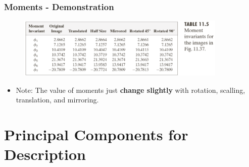 \documentclass[english,11pt,table,handout]{beamer}
\begin{document}
\frame
{
	\frametitle{Moments - Demonstration}
	\begin{figure}[!h]
		\includegraphics[width=10cm]{moment_2.png}
	\end{figure}
	\begin{itemize}
		\item Note: The value of moments just \alert{\textbf{change slightly}} with rotation, scalling, translation, and mirroring.
	\end{itemize}
}
\section{Principal Components for Description}
\end{document}
